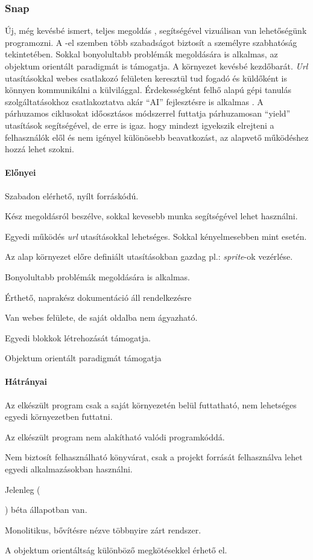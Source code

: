 \documentclass[12pt,a4paper,oneside]{report} %
\begin{document}
\subsubsection{Snap} \label{snap}Új, még kevésbé  ismert, teljes megoldás \cite{harvey2013snap}, segítségével vizuálisan van lehetőségünk programozni. A -el szemben több szabadságot biztosít a személyre szabhatóság tekintetében. Sokkal bonyolultabb problémák megoldására is alkalmas, az objektum orientált paradigmát is támogatja. A környezet kevésbé kezdőbarát. \textit{Url} utasításokkal webes  csatlakozó felületen keresztül tud fogadó és küldőként is könnyen kommunikálni a külvilággal. Érdekességként felhő alapú gépi tanulás szolgáltatásokhoz csatlakoztatva akár ``AI'' fejlesztésre is alkalmas \cite{kahn2018ai}. A párhuzamos ciklusokat időosztásos módszerrel futtatja párhuzamosan ``yield'' utasítások segítségével, de erre is igaz. hogy mindezt igyekszik elrejteni a felhasználók elől és nem igényel különösebb beavatkozást, az alapvető működéshez hozzá lehet szokni.
\paragraph{Előnyei} 
\begin{compactitem}
	\item Szabadon elérhető, nyílt forráskódú.
	\item Kész megoldásról beszélve, sokkal kevesebb munka segítségével lehet használni.
	\item Egyedi működés \textit{url} utasításokkal lehetséges. Sokkal kényelmesebben mint  esetén.
	\item Az alap környezet előre definiált utasításokban gazdag pl.: \textit{sprite}-ok vezérlése.
	\item Bonyolultabb problémák megoldására is alkalmas.
	\item Érthető, naprakész dokumentáció áll rendelkezésre
	\item Van webes felülete, de saját oldalba nem ágyazható.
	\item Egyedi blokkok létrehozását támogatja.
	\item Objektum orientált paradigmát támogatja
\end{compactitem}
\paragraph{Hátrányai} 
\begin{compactitem}
	\item Az elkészült program csak a saját környezetén belül futtatható, nem lehetséges egyedi környezetben futtatni.
	\item Az elkészült program nem alakítható valódi programkóddá.
	\item Nem biztosít felhasználható könyvárat, csak a projekt forrását felhasználva lehet egyedi alkalmazásokban használni.
	\item Jelenleg (\date{\today}) béta állapotban van.
	\item Monolitikus, bővítésre nézve többnyire zárt rendszer.
	\item A objektum orientáltság különböző megkötésekkel érhető el.
\end{compactitem}
\end{document}
